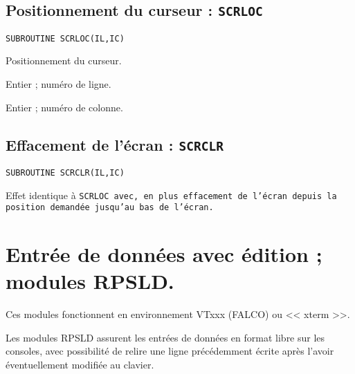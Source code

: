 \documentclass[a4paper,12pt,titlepage]{article}
\newcommand{\darg}[1]{\item[\tt #1\rm]}
\newcommand{\fsub}[1]{\hbox {\tt SUBROUTINE #1  } \medskip }
\newenvironment{argdesc}{\begin{list}{-}{\leftmargin 8em \labelwidth 7em}}%
{\end{list}}
\begin{document}
\subsection{Positionnement du curseur : \tt SCRLOC}
\fsub{SCRLOC(IL,IC)}

    Positionnement du curseur.
\begin{argdesc}
    \darg{IL :}   Entier ;  num\'ero de ligne.
    \darg{IC :}   Entier ;  num\'ero de colonne.
\end{argdesc}

\subsection{Effacement de l'\'ecran : \tt SCRCLR}
\fsub{SCRCLR(IL,IC)}

    Effet identique \`a \tt SCRLOC\rm\ avec,  en plus effacement de  l'\'ecran 
depuis  la  position demand\'ee jusqu'au bas  de  l'\'ecran.

\section{Entr\'ee de donn\'ees avec \'edition ;  modules RPSLD.}

   Ces modules fonctionnent en environnement VTxxx (FALCO) ou << xterm >>.

    Les modules RPSLD assurent les entr\'ees de donn\'ees en format libre
sur les consoles, avec possibilit\'e de relire une ligne pr\'ec\'edemment
\'ecrite apr\`es l'avoir \'eventuellement modifi\'ee au clavier.  
\end{document}
